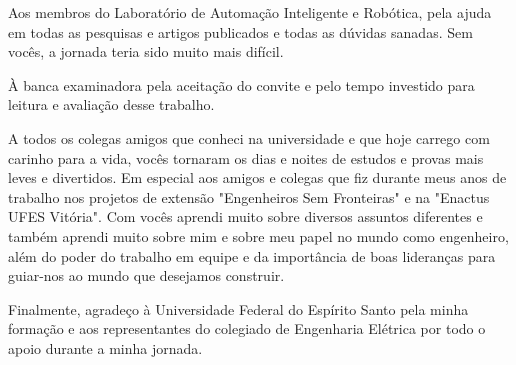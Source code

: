 \begin{agradecimentos}
Aos membros do Laboratório de Automação Inteligente e Robótica, pela ajuda em todas as pesquisas e artigos publicados e todas as dúvidas sanadas. Sem vocês, a jornada teria sido muito mais difícil.

À banca examinadora pela aceitação do convite e pelo tempo investido para leitura e avaliação desse trabalho.

A todos os colegas amigos que conheci na universidade e que hoje carrego com carinho para a vida, vocês tornaram os dias e noites de estudos e provas mais leves e divertidos. Em especial aos amigos e colegas que fiz durante meus anos de trabalho nos projetos de extensão "Engenheiros Sem Fronteiras" e na "Enactus UFES Vitória". Com vocês aprendi muito sobre diversos assuntos diferentes e também aprendi muito sobre mim e sobre meu papel no mundo como engenheiro, além do poder do trabalho em equipe e da importância de boas lideranças para guiar-nos ao mundo que desejamos construir.

Finalmente, agradeço à Universidade Federal do Espírito Santo pela minha formação e aos representantes do colegiado de Engenharia Elétrica por todo o apoio durante a minha jornada.


\end{agradecimentos}




